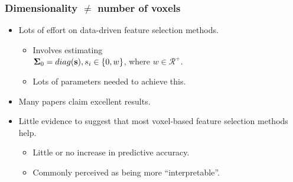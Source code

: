 \begin{frame}
\frametitle{Dimensionality $\ne$ number of voxels}
\begin{itemize}
\item Lots of effort on data-driven feature selection methods.
\begin{itemize}
\item Involves estimating\\
      $\boldsymbol\Sigma_0 = diag({\bf s}), s_i \in \{0,w\}$, where $w \in \mathcal{R}^+$.
\item Lots of parameters needed to achieve this.
\end{itemize}
\item Many papers claim excellent results.
\item Little evidence to suggest that most voxel-based feature selection methods help.
\begin{itemize}
\item Little or no increase in predictive accuracy.
\item Commonly perceived as being more ``interpretable''.
\end{itemize}
\end{itemize}
\end{frame}




